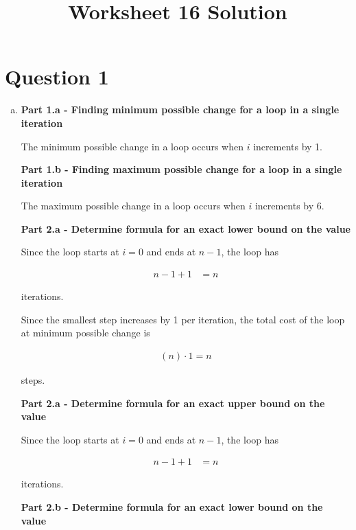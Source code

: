 \documentclass[12pt]{article}
\begin{document}
\title{Worksheet 16 Solution}
\maketitle

\section*{Question 1}
\begin{enumerate}[a.]
    \item

    \textbf{Part 1.a - Finding minimum possible change for a loop in a single iteration}

    The minimum possible change in a loop occurs when $i$ increments by 1.

    \textbf{Part 1.b - Finding maximum possible change for a loop in a single iteration}

    The maximum possible change in a loop occurs when $i$ increments by 6.

    \textbf{Part 2.a - Determine formula for an exact lower bound on the value}

    Since the loop starts at $i=0$ and ends at $n-1$, the loop has

    \begin{align}
        n-1+1 &= n
    \end{align}

    iterations.

    \bigskip

    Since the smallest step increases by 1 per iteration, the total cost of the
    loop at minimum possible change is

    \begin{align}
        (n) \cdot 1 = n
    \end{align}

    steps.


    \textbf{Part 2.a - Determine formula for an exact upper bound on the value}

    Since the loop starts at $i=0$ and ends at $n-1$, the loop has

    \begin{align}
        n-1+1 &= n
    \end{align}

    iterations.

    \textbf{Part 2.b - Determine formula for an exact lower bound on the value}

    \bigskip


\end{enumerate}
\end{document}
